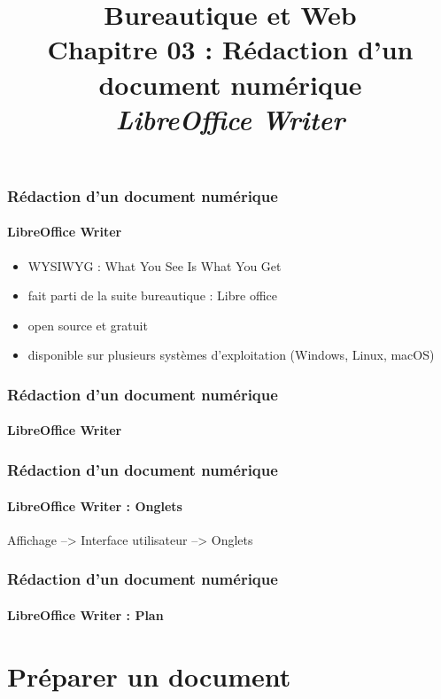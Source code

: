 \documentclass[xcolor=table]{beamer}
\title[BWEB : 03- Rédaction (LibreOffice Writer)] %
{Bureautique et Web \\Chapitre 03 : Rédaction d'un document numérique \\ \slshape\small  LibreOffice Writer}
\begin{document}
\begin{frame}
\frametitle{Rédaction d'un document numérique}
\framesubtitle{LibreOffice Writer}

\begin{itemize}
	\item WYSIWYG : What You See Is What You Get
	\item fait parti de la suite bureautique : Libre office
	\item open source et gratuit
	\item disponible sur plusieurs systèmes d'exploitation (Windows, Linux, macOS)
\end{itemize}

\end{frame}

\begin{frame}
\frametitle{Rédaction d'un document numérique}
\framesubtitle{LibreOffice Writer}

\begin{center}
\end{center}

\end{frame}

\begin{frame}
\frametitle{Rédaction d'un document numérique}
\framesubtitle{LibreOffice Writer : Onglets}
\vspace{-.7em}
Affichage --> Interface utilisateur --> Onglets

\begin{center}
\end{center}

\end{frame}

\begin{frame}
\frametitle{Rédaction d'un document numérique}
\framesubtitle{LibreOffice Writer : Plan}

\begin{multicols}{2}
	\tableofcontents
\end{multicols}
\end{frame}

\section{Préparer un document}
\end{document}
